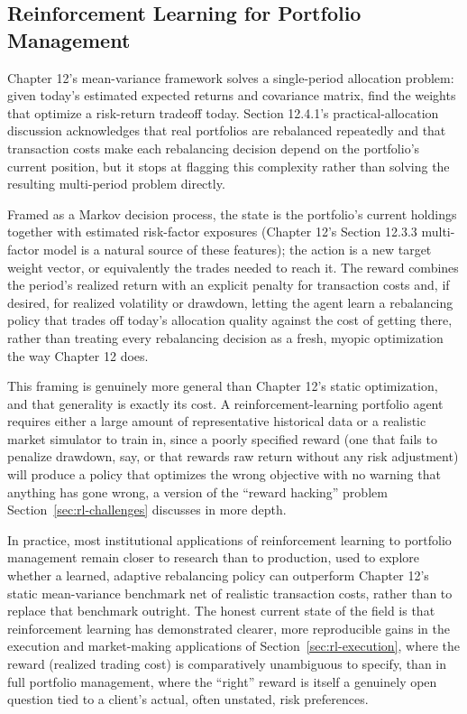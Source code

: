 \documentclass[../ai_in_finance]{subfiles}
\begin{document}
\subsection{Reinforcement Learning for Portfolio Management}
\label{sec:rl-portfolio}

Chapter 12's mean-variance framework solves a single-period allocation problem: given today's estimated expected returns and covariance matrix, find the weights that optimize a risk-return tradeoff today. Section 12.4.1's practical-allocation discussion acknowledges that real portfolios are rebalanced repeatedly and that transaction costs make each rebalancing decision depend on the portfolio's current position, but it stops at flagging this complexity rather than solving the resulting multi-period problem directly.

Framed as a Markov decision process, the state is the portfolio's current holdings together with estimated risk-factor exposures (Chapter 12's Section 12.3.3 multi-factor model is a natural source of these features); the action is a new target weight vector, or equivalently the trades needed to reach it. The reward combines the period's realized return with an explicit penalty for transaction costs and, if desired, for realized volatility or drawdown, letting the agent learn a rebalancing policy that trades off today's allocation quality against the cost of getting there, rather than treating every rebalancing decision as a fresh, myopic optimization the way Chapter 12 does.

This framing is genuinely more general than Chapter 12's static optimization, and that generality is exactly its cost. A reinforcement-learning portfolio agent requires either a large amount of representative historical data or a realistic market simulator to train in, since a poorly specified reward (one that fails to penalize drawdown, say, or that rewards raw return without any risk adjustment) will produce a policy that optimizes the wrong objective with no warning that anything has gone wrong, a version of the ``reward hacking'' problem Section~\ref{sec:rl-challenges} discusses in more depth.

In practice, most institutional applications of reinforcement learning to portfolio management remain closer to research than to production, used to explore whether a learned, adaptive rebalancing policy can outperform Chapter 12's static mean-variance benchmark net of realistic transaction costs, rather than to replace that benchmark outright. The honest current state of the field is that reinforcement learning has demonstrated clearer, more reproducible gains in the execution and market-making applications of Section~\ref{sec:rl-execution}, where the reward (realized trading cost) is comparatively unambiguous to specify, than in full portfolio management, where the ``right'' reward is itself a genuinely open question tied to a client's actual, often unstated, risk preferences.
\end{document}
